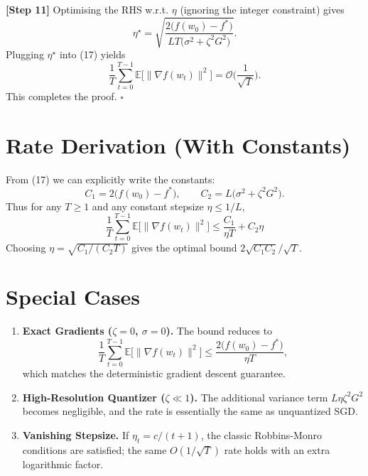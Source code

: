\documentclass{article}
\begin{document}
\noindent\textbf{[Step 11]} Optimising the RHS w.r.t. $\eta$ (ignoring the integer constraint) gives
\[
\eta^{\star}= \sqrt{\frac{2\big(f(w_{0})-f^{*}\big)}{L T\big(\sigma^{2}+\zeta^{2}G^{2}\big)}}.
\]
Plugging $\eta^{\star}$ into (17) yields
\[
\frac{1}{T}\sum_{t=0}^{T-1}\mathbb{E}\!\big[\|\nabla f(w_{t})\|^{2}\big]
= \mathcal{O}\!\Big(\frac{1}{\sqrt{T}}\Big). \tag{18}
\]
This completes the proof. \hfill $\square$

\section*{Rate Derivation (With Constants)}
From (17) we can explicitly write the constants:
\[
C_{1}=2\big(f(w_{0})-f^{*}\big),\qquad
C_{2}=L\big(\sigma^{2}+\zeta^{2}G^{2}\big).
\]
Thus for any $T\ge1$ and any constant stepsize $\eta\le 1/L$,
\[
\boxed{\;
\frac{1}{T}\sum_{t=0}^{T-1}\mathbb{E}\!\big[\|\nabla f(w_{t})\|^{2}\big]
\le \frac{C_{1}}{\eta T}+C_{2}\eta
\;}
\]
Choosing $\eta = \sqrt{C_{1}/(C_{2}T)}$ gives the optimal bound $2\sqrt{C_{1}C_{2}}/ \sqrt{T}$.

\section*{Special Cases}
\begin{enumerate}
\item \textbf{Exact Gradients ($\zeta=0$, $\sigma=0$).} The bound reduces to
\[
\frac{1}{T}\sum_{t=0}^{T-1}\mathbb{E}\!\big[\|\nabla f(w_{t})\|^{2}\big]
\le \frac{2\big(f(w_{0})-f^{*}\big)}{\eta T},
\]
which matches the deterministic gradient descent guarantee.
\item \textbf{High‑Resolution Quantizer ($\zeta\ll1$).} The additional variance term $L\eta\zeta^{2}G^{2}$ becomes negligible, and the rate is essentially the same as unquantized SGD.
\item \textbf{Vanishing Stepsize.} If $\eta_{t}=c/(t+1)$, the classic Robbins‑Monro conditions are satisfied; the same $O(1/\sqrt{T})$ rate holds with an extra logarithmic factor.
\end{enumerate}
\end{document}

